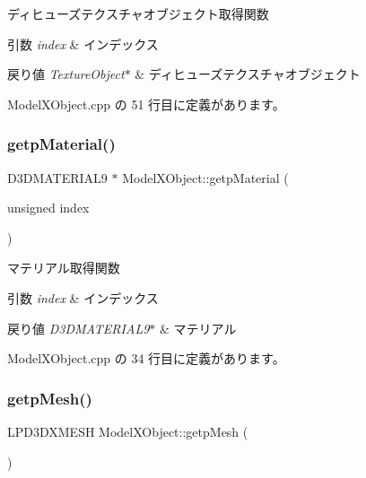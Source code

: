 ディヒューズテクスチャオブジェクト取得関数 


\begin{DoxyParams}{引数}
{\em index} & インデックス \\
\hline
\end{DoxyParams}

\begin{DoxyRetVals}{戻り値}
{\em Texture\+Object$\ast$} & ディヒューズテクスチャオブジェクト \\
\hline
\end{DoxyRetVals}


 Model\+X\+Object.\+cpp の 51 行目に定義があります。

\mbox{\label{class_model_x_object_a02fd2eb65e848f354c92f7640c18a93c}} 
\subsubsection{\texorpdfstring{getp\+Material()}{getpMaterial()}}
{\footnotesize\ttfamily D3\+D\+M\+A\+T\+E\+R\+I\+A\+L9 $\ast$ Model\+X\+Object\+::getp\+Material (\begin{DoxyParamCaption}\item[{unsigned}]{index }\end{DoxyParamCaption})}



マテリアル取得関数 


\begin{DoxyParams}{引数}
{\em index} & インデックス \\
\hline
\end{DoxyParams}

\begin{DoxyRetVals}{戻り値}
{\em D3\+D\+M\+A\+T\+E\+R\+I\+A\+L9$\ast$} & マテリアル \\
\hline
\end{DoxyRetVals}


 Model\+X\+Object.\+cpp の 34 行目に定義があります。

\mbox{\label{class_model_x_object_af40b9567dda03049daf9f299b33ba5a0}} 
\subsubsection{\texorpdfstring{getp\+Mesh()}{getpMesh()}}
{\footnotesize\ttfamily L\+P\+D3\+D\+X\+M\+E\+SH Model\+X\+Object\+::getp\+Mesh (\begin{DoxyParamCaption}{ }\end{DoxyParamCaption})}



